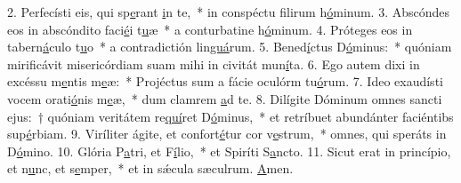 2. Perfecísti eis, qui sp\uline{e}rant \uline{i}n te,~* in conspéctu filirum h\uline{ó}minum.
3. Abscóndes eos in abscóndito faci\uline{é}i t\uline{u}æ~* a conturbatine h\uline{ó}minum.
4. Próteges eos in tabern\uline{á}culo t\uline{u}o~* a contradictión lin\uline{guá}rum.
5. Bened\uline{í}ctus D\uline{ó}minus:~* quóniam mirificávit misericórdiam suam mihi in civitát mun\uline{í}ta.
6. Ego autem dixi in excéssu m\uline{e}ntis m\uline{e}æ:~* Projéctus sum a fácie oculórm tu\uline{ó}rum.
7. Ideo exaudísti vocem orati\uline{ó}nis m\uline{e}æ,~* dum clamrem \uline{a}d te.
8. Dilígite Dóminum omnes sancti ejus:~† quóniam veritátem re\uline{quí}ret D\uline{ó}minus,~* et retríbuet abundánter faciéntibs sup\uline{é}rbiam.
9. Viríliter ágite, et confort\uline{é}tur cor v\uline{e}strum,~* omnes, qui speráts in D\uline{ó}mino.
10. Glória P\uline{a}tri, et F\uline{í}lio,~* et Spiríti S\uline{a}ncto.
11. Sicut erat in princípio, et n\uline{u}nc, et s\uline{e}mper,~* et in sǽcula sæculrum. \uline{A}men.
